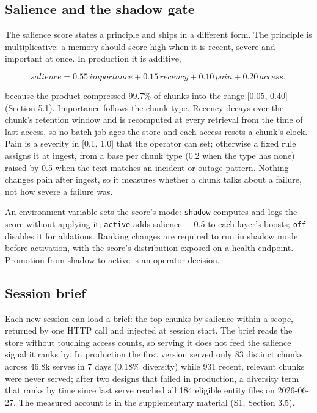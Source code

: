\documentclass[a4paper,fleqn]{cas-sc}
\newcounter{none}  %
\begin{document}
\subsection{Salience and the shadow gate}

The salience score states a principle and ships in a different form. The principle is multiplicative: a memory should score high when it is recent, severe and important at once. In production it is additive,

\[\mathit{salience} = 0.55\,\mathit{importance} + 0.15\,\mathit{recency} + 0.10\,\mathit{pain} + 0.20\,\mathit{access},\]

because the product compressed 99.7\% of chunks into the range {[}0.05, 0.40{]} (Section 5.1). Importance follows the chunk type. Recency decays over the chunk's retention window and is recomputed at every retrieval from the time of last access, so no batch job ages the store and each access resets a chunk's clock. Pain is a severity in {[}0.1, 1.0{]} that the operator can set; otherwise a fixed rule assigns it at ingest, from a base per chunk type (0.2 when the type has none) raised by 0.5 when the text matches an incident or outage pattern. Nothing changes pain after ingest, so it measures whether a chunk talks about a failure, not how severe a failure was.

An environment variable sets the score's mode: \texttt{shadow} computes and logs the score without applying it; \texttt{active} adds salience − 0.5 to each layer's boosts; \texttt{off} disables it for ablations. Ranking changes are required to run in shadow mode before activation, with the score's distribution exposed on a health endpoint. Promotion from shadow to active is an operator decision.

\subsection{Session brief}

Each new session can load a brief: the top chunks by salience within a scope, returned by one HTTP call and injected at session start. The brief reads the store without touching access counts, so serving it does not feed the salience signal it ranks by. In production the first version served only 83 distinct chunks across 46.8k serves in 7 days (0.18\% diversity) while 931 recent, relevant chunks were never served; after two designs that failed in production, a diversity term that ranks by time since last serve reached all 184 eligible entity files on 2026-06-27. The measured account is in the supplementary material (S1, Section 3.5).
\end{document}
